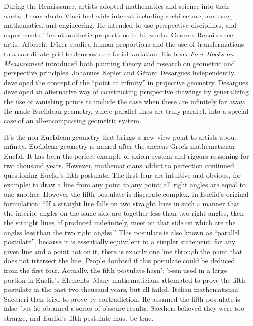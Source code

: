 \documentclass{article}
\begin{document}
During the Renaissance, artists adopted mathematics and science into their works. Leonardo da Vinci had wide interest including architecture, anatomy, mathematics, and engineering. He intended to use perspective disciplines, and experiment different aesthetic proportions in his works. German Renaissance artist Albrecht Dürer studied human proportions and the use of transformations to a coordinate grid to demonstrate facial variation. His book {\em Four Books on Measurement} introduced both painting theory and research on geometric and perspective principles. Johannes Kepler and Gérard Desargues independently developed the concept of the ``point at infinity'' in projective geometry. Desargues developed an alternative way of constructing perspective drawings by generalizing the use of vanishing points to include the case when these are infinitely far away. He made Euclidean geometry, where parallel lines are truly parallel, into a special case of an all-encompassing geometric system.

It's the non-Euclidean geometry that brings a new view point to artists about infinity. Euclidean geometry is named after the ancient Greek mathematician Euclid. It has been the perfect example of axiom system and rigours reasoning for two thousand years. However, mathematicians addict to perfection continued questioning Euclid's fifth postulate. The first four are intuitive and obvious, for example: to draw a line from any point to any point; all right angles are equal to one another. However the fifth postulate is disparate complex. In Euclid's original formulation: ``If a straight line falls on two straight lines in such a manner that the interior angles on the same side are together less than two right angles, then the straight lines, if produced indefinitely, meet on that side on which are the angles less than the two right angles.'' This postulate is also known as ``parallel postulate'', because it is essentially equivalent to a simpler statement: for any given line and a point not on it, there is exactly one line through the point that does not intersect the line. People doubted if this postulate could be deduced from the first four. Actually, the fifth postulate hasn't been used in a large portion in Euclid's Elements. Many mathematicians attempted to prove the fifth postulate in the past two thousand years, but all failed. Italian mathematician Saccheri then tried to prove by contradiction. He assumed the fifth postulate is false, but he obtained a series of obscure results. Saccheri believed they were too strange, and Euclid's fifth postulate must be true.
\end{document}
